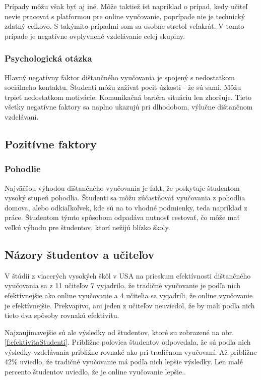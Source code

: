 \documentclass[10pt,twoside,slovak,a4paper]{article}
\begin{document}
Prípady môžu však byť aj iné. Môže taktiež ísť napríklad o prípad, kedy učiteľ nevie pracovať s platformou pre online vyučovanie, poprípade nie je technický zdatný celkovo. S takýmito prípadmi som sa osobne stretol veľakrát. V tomto prípade je negatívne ovplyvnené vzdelávanie celej skupiny.

\subsubsection{Psychologická otázka}
Hlavný negatívny faktor dištančného vyučovania je spojený s nedostatkom sociálneho kontaktu. Študenti môžu zažívať pocit úzkosti - že sú sami. Môžu trpieť nedostatkom motivácie. Komunikačná bariéra situáciu len zhoršuje. Tieto všetky negatívne faktory sa naplno ukazujú pri dlhodobom, výlučne dištančnom vzdelávaní.

\subsection{Pozitívne faktory}
\subsubsection{Pohodlie}
Najväčšou výhodou dištančného vyučovania je fakt, že poskytuje študentom vysoký stupeň pohodlia. Študenti sa môžu zúčastňovať vyučovania z pohodlia domova, alebo odkiaľkoľvek, kde sú na to vhodné podmienky, teda napríklad z práce. Študentom týmto spôsobom odpadáva nutnosť cestovať, čo môže mať veľkú výhodu pre študentov, ktorí nežijú blízko školy\cite{Weidlich:Impact}.

\subsection{Názory študentov a učiteľov} \label{nazory}
V štúdii z viacerých vysokých škôl v USA na prieskum efektívnosti dištančného vyučovania sa z 11 učiteľov 7 vyjadrilo, že tradičné vyučovanie je podľa nich efektívnejšie ako online vyučovanie a 4 učitelia sa vyjadrili, že online vyučovanie je efektívnejšie. Prekvapivo, ani jeden z učiteľov neuviedol, že by mali podla nich tieto dva spôsoby rovnakú efektivitu. 

Najzaujímavejšie sú ale výsledky od študentov, ktoré su zobrazené na obr. \ref{f:efektivitaStudenti}. Približne polovica študentov odpovedala, že sú podla nich výsledky vzdelávania približne rovnaké ako pri tradičnom vyučovaní. Až približne 42\% uviedlo, že tradičné vyučovanie má podľa nich lepšie výsledky. Len malé percento študentov uviedlo, že je online vyučovanie lepšie.\cite{Warren:Effectiveness}\cite{Balas:DistanceLearning}.
\end{document}

